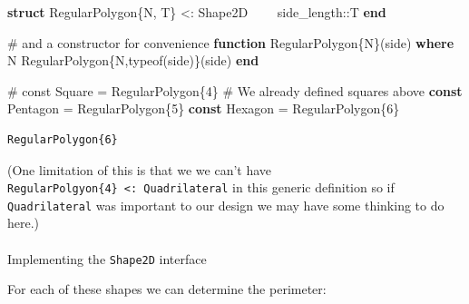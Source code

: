 \documentclass[
]{article}
\makeatletter
\let\oldparagraph\paragraph
\renewcommand{\paragraph}{
    \@ifstar
      \xxxParagraphStar
      \xxxParagraphNoStar
  }
\newcommand{\xxxParagraphStar}[1]{\oldparagraph*{#1}\mbox{}}
\newcommand{\xxxParagraphNoStar}[1]{\oldparagraph{#1}\mbox{}}
\newenvironment{Shaded}{\begin{snugshade}}{\end{snugshade}}
\newcommand{\CommentTok}[1]{\textcolor[rgb]{0.37,0.37,0.37}{#1}}
\newcommand{\DataTypeTok}[1]{\textcolor[rgb]{0.68,0.00,0.00}{#1}}
\newcommand{\FloatTok}[1]{\textcolor[rgb]{0.68,0.00,0.00}{#1}}
\newcommand{\FunctionTok}[1]{\textcolor[rgb]{0.28,0.35,0.67}{#1}}
\newcommand{\KeywordTok}[1]{\textcolor[rgb]{0.00,0.23,0.31}{\textbf{#1}}}
\newcommand{\NormalTok}[1]{\textcolor[rgb]{0.00,0.23,0.31}{#1}}
\newcommand{\OperatorTok}[1]{\textcolor[rgb]{0.37,0.37,0.37}{#1}}
\makeatother
\begin{document}
\begin{Shaded}
\begin{Highlighting}[]
\KeywordTok{struct}\NormalTok{ RegularPolygon\{N, T\} }\OperatorTok{\textless{}:}\DataTypeTok{ Shape2D}
\NormalTok{    side\_length}\OperatorTok{::}\DataTypeTok{T}
\KeywordTok{end} 

\CommentTok{\# and a constructor for convenience}
\KeywordTok{function} \FunctionTok{RegularPolygon}\DataTypeTok{\{N\}}\NormalTok{(side) }\KeywordTok{where}\NormalTok{ N}
   \FunctionTok{RegularPolygon}\DataTypeTok{\{N,typeof(side)\}}\NormalTok{(side)}
\KeywordTok{end}

\CommentTok{\# const Square = RegularPolygon\{4\}  \# We already defined squares above}
\KeywordTok{const}\NormalTok{ Pentagon }\OperatorTok{=}\NormalTok{ RegularPolygon\{}\FloatTok{5}\NormalTok{\}}
\KeywordTok{const}\NormalTok{ Hexagon }\OperatorTok{=}\NormalTok{ RegularPolygon\{}\FloatTok{6}\NormalTok{\}}
\end{Highlighting}
\end{Shaded}

\begin{verbatim}
RegularPolygon{6}
\end{verbatim}

(One limitation of this is that we we can't have
\texttt{RegularPolgyon\{4\}\ \textless{}:\ Quadrilateral} in this
generic definition so if \texttt{Quadrilateral} was important to our
design we may have some thinking to do here.)

\paragraph{\texorpdfstring{Implementing the \texttt{Shape2D}
interface}{Implementing the Shape2D interface}}\label{implementing-the-shape2d-interface}

For each of these shapes we can determine the perimeter:
\end{document}
